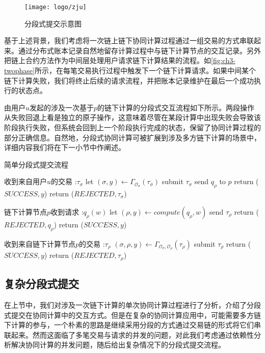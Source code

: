 \begin{figure}[htbp]
    \centering
    \texttt{[image: logo/zju]}
    \caption{\label{fig:ch3-twophase}分段式提交示意图}
\end{figure}

基于上述背景，我们考虑将一次链上链下协同计算过程通过一组交易的方式串联起来。通过分布式账本记录自然地留存计算过程中与链下计算节点的交互记录。另外把链上合约方法作为中间层处理用户请求链下计算结果的流程。如\autoref{fig:ch3-twophase}所示，在每笔交易执行过程中触发下一个链下计算请求。如果中间某个链下计算失败，我们将终止后续的请求流程，并把账本记录维护在最后一个成功执行的状态点。

由用户$u$发起的涉及一次基于$p$的链下计算的分段式交互流程如下所示。两段操作从失败回退上看是独立的原子操作，这意味着尽管在某段计算中出现失败会导致该阶段执行失败，但系统会回到上一个阶段执行完成的状态，保留了协同计算过程的部分正确信息。自然地，分段式协同计算可被扩展到涉及多方链下计算的场景中，详细内容我们将在下一小节中作阐述。

\begin{breakablealgorithm}
    \caption{简单分段式提交流程}
    \label{alg:ch3-5}
    \begin{algorithmic} 
        \item[收到来自用户$u$的交易]:$\tau_\sigma$
        \STATE let $(\sigma, y) \leftarrow \Gamma_{\mathcal{O}_\sigma}(\tau_\sigma)$
        \IF {$\sigma \neq \perp$}
        \STATE submit $\tau_\sigma$
        \STATE send $q_\rho$ to $p$
        \STATE return ($SUCCESS, y$)
        \ENDIF
        \STATE return ($REJECTED, \tau_\sigma$)
        \item[链下计算节点$p$收到请求]:$q_\rho(w)$
        \STATE let $(\rho, y) \leftarrow compute(q_\rho, w)$
        \IF {$\rho \neq \perp$} 
        \STATE send $\tau_\rho$
        \STATE return ($REJECTED, q_\rho$)
        \ENDIF
        \STATE return ($SUCCESS, y$)
        \item[收到来自链下计算节点$p$的交易]:$\tau_\rho$
        \STATE $(\sigma, \rho, y) \leftarrow \Gamma_{\mathcal{O}_\sigma, \mathcal{O}_\rho}(\tau_\rho)$
        \IF {$\sigma \neq \perp$}
        \STATE submit $\tau_\rho$
        \STATE return ($SUCCESS, y$)
        \ENDIF
        \STATE return ($REJECTED, \tau_\rho$)
    \end{algorithmic}
\end{breakablealgorithm}

\subsection{复杂分段式提交}
在上节中，我们对涉及一次链下计算的单次协同计算过程进行了分析，介绍了分段式提交在协同计算中的交互方式。但是在复杂的协同计算应用中，可能需要多方链下计算的参与，一个朴素的思路是继续采用分段的方式通过交易链的形式将它们串联起来。然而这面临了多笔交易与请求的并发的问题，对此我们考虑通过依赖性分析解决协同计算的并发问题，随后给出复杂情况下的分段式提交流程。

